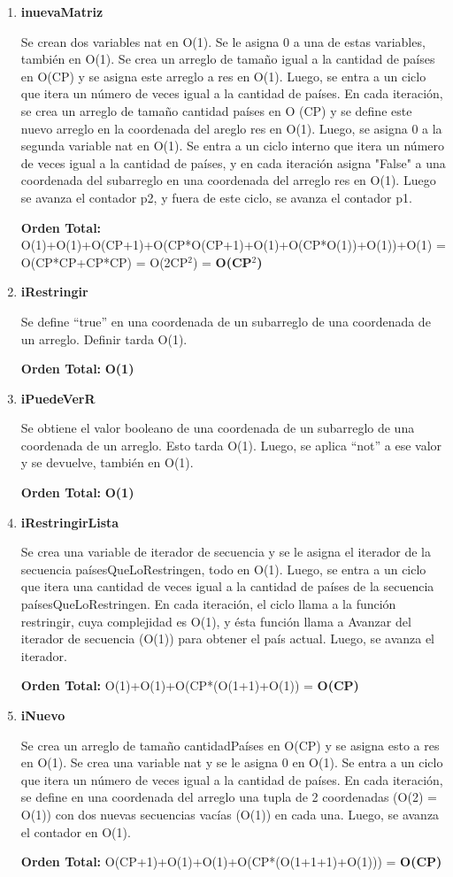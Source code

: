 \begin{enumerate}
\item\textbf{inuevaMatriz}
\par Se crean dos variables nat en O(1). Se le asigna 0 a una de estas variables, también en O(1). Se crea un arreglo de tamaño igual a la cantidad de países en O(CP) y se asigna este arreglo a res en O(1). Luego, se entra a un ciclo que itera un número de veces igual a la cantidad de países. En cada iteración, se crea un arreglo de tamaño cantidad países en O (CP) y se define este nuevo arreglo en la coordenada del areglo res en O(1). Luego, se asigna 0 a la segunda variable nat en O(1). Se entra a un ciclo interno que itera un número de veces igual a la cantidad de países, y en cada iteración asigna "False" a una coordenada del subarreglo en una coordenada del arreglo res en O(1). Luego se avanza el contador p2, y fuera de este ciclo, se avanza el contador p1.
\par\textbf{Orden Total:} O(1)+O(1)+O(CP+1)+O(CP*O(CP+1)+O(1)+O(CP*O(1))+O(1))+O(1) = O(CP*CP+CP*CP) = O(2CP$^2$) = \textbf{O(CP$^2$)}

\item\textbf{iRestringir}
\par Se define ``true'' en una coordenada de un subarreglo de una coordenada de un arreglo. Definir tarda O(1).
\par\textbf{Orden Total:} \textbf{O(1)}

\item\textbf{iPuedeVerR}
\par Se obtiene el valor booleano de una coordenada de un subarreglo de una coordenada de un arreglo. Esto tarda O(1). Luego, se aplica ``not'' a ese valor y se devuelve, también en O(1).
\par\textbf{Orden Total:} \textbf{O(1)}

\item\textbf{iRestringirLista}
\par Se crea una variable de iterador de secuencia y se le asigna el iterador de la secuencia paísesQueLoRestringen, todo en O(1). Luego, se entra a un ciclo que itera una cantidad de veces igual a la cantidad de países de la secuencia paísesQueLoRestringen. En cada iteración, el ciclo llama a la función restringir, cuya complejidad es O(1), y ésta función llama a Avanzar del iterador de secuencia (O(1)) para obtener el país actual. Luego, se avanza el iterador.
\par\textbf{Orden Total:} O(1)+O(1)+O(CP*(O(1+1)+O(1)) = \textbf{O(CP)}

\item\textbf{iNuevo}
\par Se crea un arreglo de tamaño cantidadPaíses en O(CP) y se asigna esto a res en O(1).  Se crea una variable nat y se le asigna 0 en O(1). Se entra a un ciclo que itera un número de veces igual a la cantidad de países. En cada iteración, se define en una coordenada del arreglo una tupla de 2 coordenadas (O(2) = O(1)) con dos nuevas secuencias vacías (O(1)) en cada una. Luego, se avanza el contador en O(1).
\par\textbf{Orden Total:} O(CP+1)+O(1)+O(1)+O(CP*(O(1+1+1)+O(1))) = \textbf{O(CP)}


\end{enumerate}
